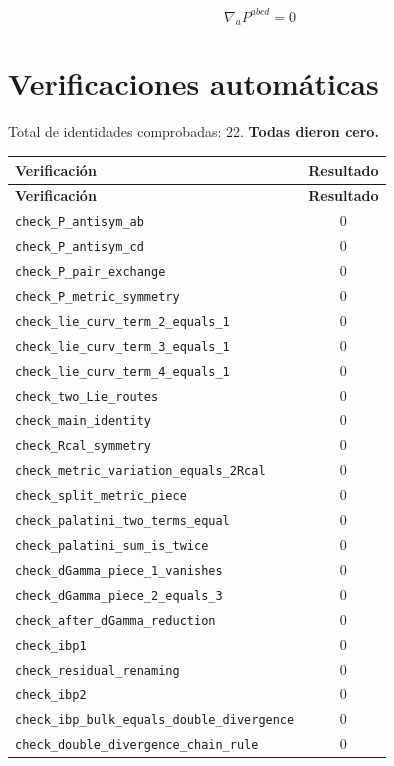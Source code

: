 \documentclass[11pt,a4paper]{article}
\begin{document}
\[
\boxed{\nabla_a P^{abcd} = 0}
\]


\section*{Verificaciones automáticas}
\noindent Total de identidades comprobadas: 22. \textbf{Todas dieron cero.}
\begin{longtable}{p{}c}
\toprule
\textbf{Verificación} & \textbf{Resultado}\\
\midrule
\endfirsthead
\toprule
\textbf{Verificación} & \textbf{Resultado}\\
\midrule
\endhead
\texttt{check\_P\_antisym\_ab} & $0$\\
\texttt{check\_P\_antisym\_cd} & $0$\\
\texttt{check\_P\_pair\_exchange} & $0$\\
\texttt{check\_P\_metric\_symmetry} & $0$\\
\texttt{check\_lie\_curv\_term\_2\_equals\_1} & $0$\\
\texttt{check\_lie\_curv\_term\_3\_equals\_1} & $0$\\
\texttt{check\_lie\_curv\_term\_4\_equals\_1} & $0$\\
\texttt{check\_two\_Lie\_routes} & $0$\\
\texttt{check\_main\_identity} & $0$\\
\texttt{check\_Rcal\_symmetry} & $0$\\
\texttt{check\_metric\_variation\_equals\_2Rcal} & $0$\\
\texttt{check\_split\_metric\_piece} & $0$\\
\texttt{check\_palatini\_two\_terms\_equal} & $0$\\
\texttt{check\_palatini\_sum\_is\_twice} & $0$\\
\texttt{check\_dGamma\_piece\_1\_vanishes} & $0$\\
\texttt{check\_dGamma\_piece\_2\_equals\_3} & $0$\\
\texttt{check\_after\_dGamma\_reduction} & $0$\\
\texttt{check\_ibp1} & $0$\\
\texttt{check\_residual\_renaming} & $0$\\
\texttt{check\_ibp2} & $0$\\
\texttt{check\_ibp\_bulk\_equals\_double\_divergence} & $0$\\
\texttt{check\_double\_divergence\_chain\_rule} & $0$\\
\bottomrule
\end{longtable}
\end{document}
